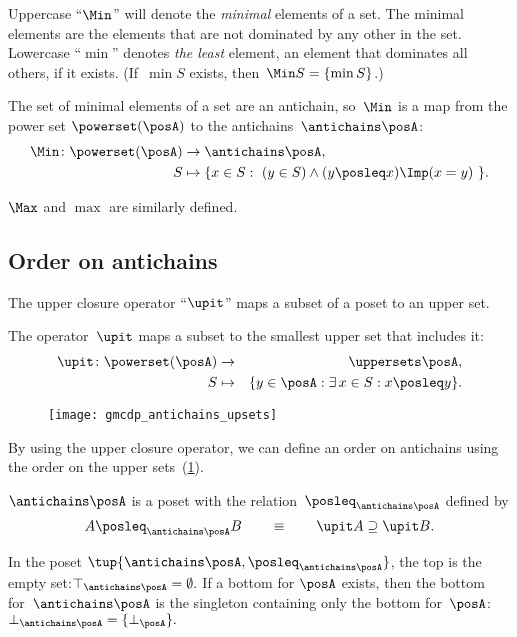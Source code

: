 


Uppercase ``$\Min$'' will denote the \emph{minimal} elements of
a set. The minimal elements are the elements that are not dominated
by any other in the set. Lowercase ``$\min$'' denotes\emph{ the
least} element, an element that dominates all others, if it exists.
(If~$\min S$ exists, then~$\Min S=\{\min S\}$.)

The set of minimal elements of a set are an antichain, so~$\Min$
is a map from the power set $\powerset(\posA)$ to the antichains~$\antichains\posA$:
\begin{align*}
    \Min\colon\powerset(\posA) & \rightarrow\antichains\posA,\\
    S & \mapsto\{x\in S:\ (y\in S)\wedge(y\posleq x)\Imp(x=y)\ \}.
\end{align*}

$\Max$ and $\max$ are similarly defined.

\subsection{Order on antichains}

The upper closure operator ``$\upit$'' maps a subset of a poset
to an upper set.
\begin{definition}
    The operator~$\upit$ maps a subset to the smallest upper set that
    includes it:
    \begin{eqnarray*}
        \upit\colon\powerset(\posA) & \rightarrow & \uppersets\posA,\\
        S & \mapsto & \{y\in\posA:\exists\,x\in S:x\posleq y\}.
    \end{eqnarray*}
\end{definition}

\begin{figure}[h]
    \centering
    \texttt{[image: gmcdp\_antichains\_upsets]}
    \caption{}
    \label{fig:antichains_upsets}
\end{figure}

By using the upper closure operator, we can define an order on antichains
using the order on the upper sets~(\cref{fig:antichains_upsets}).
\begin{lemma}
    \label{lem:antichains-are-poset}$\antichains\posA$ is a poset with
    the relation~$\posleq_{\antichains\posA}$ defined by
    \[
        A\posleq_{\antichains\posA}B\qquad\equiv\qquad\upit A\supseteq\upit B.
    \]
\end{lemma}
In the poset $\tup{\antichains\posA,\posleq_{\antichains\posA}}$,
the top is the empty set:$\top_{\antichains\posA}=\emptyset.$ If
a bottom for $\posA$ exists, then the bottom for~$\antichains\posA$
is the singleton containing only the bottom for~$\posA$: $\bot_{\antichains\posA}=\{\bot_{\posA}\}.$






